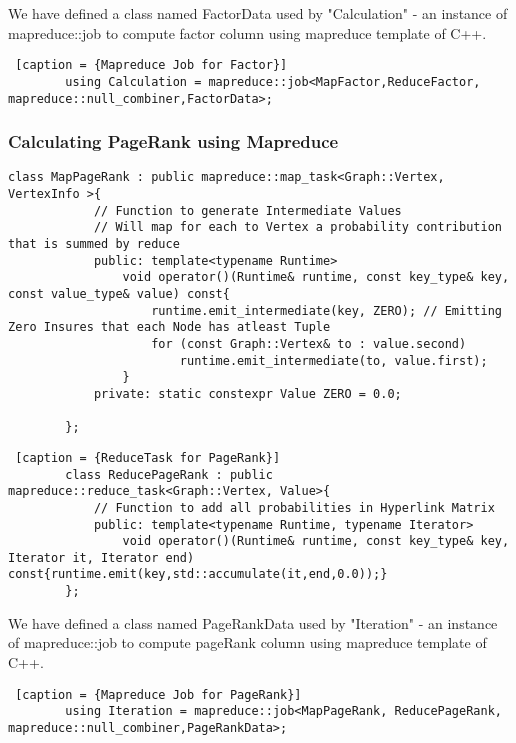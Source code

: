 \documentclass{article}
\begin{document}
    We have defined a class named FactorData used by "Calculation" - an instance of mapreduce::job to compute factor column using mapreduce template of C++.
    
    \begin{lstlisting} [caption = {Mapreduce Job for Factor}]
        using Calculation = mapreduce::job<MapFactor,ReduceFactor, mapreduce::null_combiner,FactorData>;
    \end{lstlisting}
    
    
    \subsubsection{Calculating PageRank using Mapreduce}
    
    \begin{lstlisting}[caption={ MapTask for PageRank}] 
        class MapPageRank : public mapreduce::map_task<Graph::Vertex, VertexInfo >{
            // Function to generate Intermediate Values
            // Will map for each to Vertex a probability contribution that is summed by reduce      
            public: template<typename Runtime>
                void operator()(Runtime& runtime, const key_type& key, const value_type& value) const{
                    runtime.emit_intermediate(key, ZERO); // Emitting Zero Insures that each Node has atleast Tuple
                    for (const Graph::Vertex& to : value.second) 
                        runtime.emit_intermediate(to, value.first);
                }
            private: static constexpr Value ZERO = 0.0;              
        
        };
    \end{lstlisting}
    
    \begin{lstlisting} [caption = {ReduceTask for PageRank}]
        class ReducePageRank : public mapreduce::reduce_task<Graph::Vertex, Value>{
            // Function to add all probabilities in Hyperlink Matrix        
            public: template<typename Runtime, typename Iterator>
                void operator()(Runtime& runtime, const key_type& key, Iterator it, Iterator end) const{runtime.emit(key,std::accumulate(it,end,0.0));}
        };
    \end{lstlisting}
    
    We have defined a class named PageRankData used by "Iteration" - an instance of mapreduce::job to compute pageRank column using mapreduce template of C++.
    
    \begin{lstlisting} [caption = {Mapreduce Job for PageRank}]
        using Iteration = mapreduce::job<MapPageRank, ReducePageRank, mapreduce::null_combiner,PageRankData>;
    \end{lstlisting}
    
\end{document}
